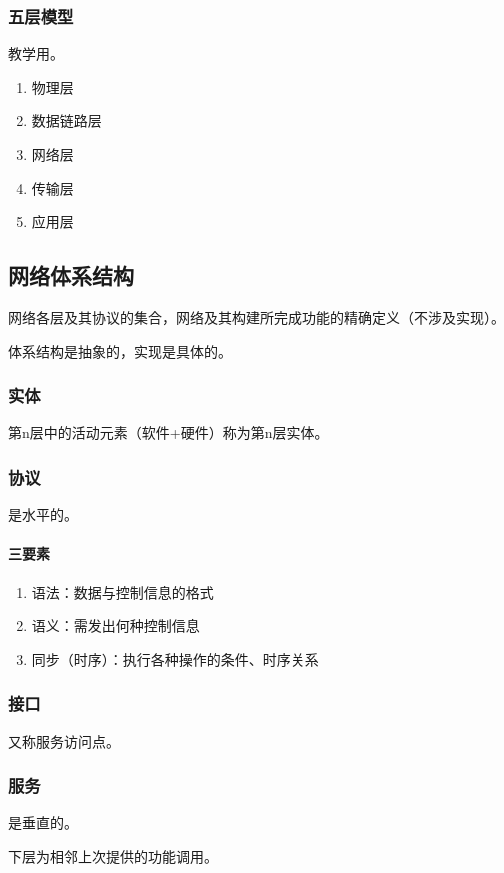 \subsubsection{五层模型}
教学用。
\begin{enumerate}
    \item 物理层
    \item 数据链路层
    \item 网络层
    \item 传输层
    \item 应用层
\end{enumerate}


\subsection{网络体系结构}
网络各层及其协议的集合，网络及其构建所完成功能的精确定义（不涉及实现）。

体系结构是抽象的，实现是具体的。

\subsubsection{实体}
第n层中的活动元素（软件+硬件）称为第n层实体。


\subsubsection{协议}
是水平的。

\paragraph{三要素}
\begin{enumerate}
    \item 语法：数据与控制信息的格式
    \item 语义：需发出何种控制信息
    \item 同步（时序）：执行各种操作的条件、时序关系
\end{enumerate}


\subsubsection{接口}
又称服务访问点。


\subsubsection{服务}
是垂直的。

下层为相邻上次提供的功能调用。



